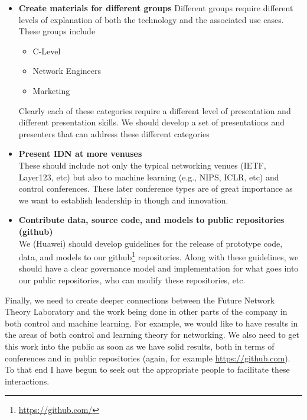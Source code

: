 \documentclass[11pt, oneside]{article}   	%
\begin{document}
\begin{itemize}
\item \textbf{Create materials for different groups} 
Different groups require different levels of explanation of both the technology and the associated use cases. These groups include
\begin{itemize}
\item{C-Level}
\item{Network Engineers}
\item{Marketing}
\end{itemize}
Clearly each of these categories require a different level of presentation and different presentation skills. We should develop a set of presentations and presenters that can
address these different categories

\item \textbf{Present IDN at more venuses} \\
These should include not only the typical networking venues (IETF, Layer123, etc) but also to machine learning (e.g., NIPS, ICLR, etc)  and control conferences. These later conference types are of great 
importance as we want to establish leadership in though and innovation.

\item \textbf{Contribute data, source code, and models to public repositories (github)} \\
We (Huawei) should develop guidelines for the release of prototype code, data, and models to our github\footnote{\url{https://github.com/}} repositories. Along with these guidelines, we should have a clear governance model and implementation for what goes into our
public repositories, who can modify these repositories, etc.
\end{itemize}

\bigskip
\noindent
Finally, we need to create deeper connections between the Future Network Theory Laboratory and the work being done in other 
parts of the company in both control and machine learning. For example, we would like to have results in the areas of both control
and learning theory for networking. We also need to get this work into the public as soon
as we have solid results, both in terms of conferences and in public repositories (again, for example \url{https://github.com}).  
To that end I have begun to seek out the appropriate people to facilitate these interactions.

\newpage


\end{document}
